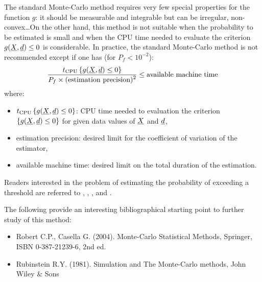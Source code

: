 {
  The standard Monte-Carlo method requires very few special properties for the function $g$: it should be measurable and integrable but can be irregular, non-convex\ldots On the other hand, this method is not suitable when the probability to be estimated is small and when the CPU time needed to evaluate the criterion $g({\underline{X}},{\underline{d}}) \leq 0$ is considerable. In practice, the standard Monte-Carlo method is not recommended except if one has (for $P_f < 10^{-2}$):
  \begin{align*}
    \frac{ \displaystyle t_\textrm{CPU} \left\{ g({\underline{X}},{\underline{d}}) \leq 0 \right\} }{ \displaystyle P_f \times (\textrm{estimation precision})^2 } \leq \textrm{available machine time}
  \end{align*}
  where:
  \begin{itemize}
  \item $t_\textrm{CPU} \left\{ g({\underline{X}},{\underline{d}}) \leq 0 \right\}$: CPU time needed to evaluation the criterion $\left\{ g({\underline{X}},{\underline{d}}) \leq 0 \right\}$ for given data values of ${\underline{X}}$ and ${\underline{d}}$,
  \item estimation precision: desired limit for the coefficient of variation of the estimator,
  \item available machine time: desired limit on the total duration of the estimation.
  \end{itemize}

  Readers interested in the problem of estimating the probability of exceeding a threshold are referred to , , ,  and .

  The following provide an interesting bibliographical starting point to further study of this method:
  \begin{itemize}
  \item Robert C.P., Casella G. (2004). Monte-Carlo Statistical Methods, Springer, ISBN 0-387-21239-6, 2nd ed.
  \item Rubinstein R.Y. (1981). Simulation and The Monte-Carlo methods, John Wiley \& Sons
  \end{itemize}
}
